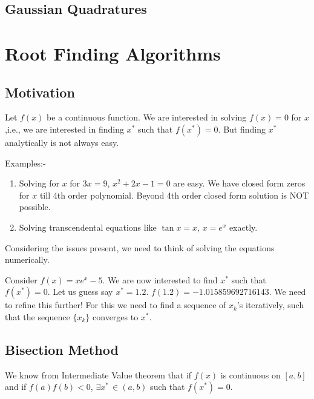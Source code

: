 \documentclass[
]{book}
\begin{document}
\hypertarget{gaussian-quadratures}{%
\section{Gaussian Quadratures}\label{gaussian-quadratures}}

\hypertarget{root-finding-algorithms}{%
\chapter{Root Finding Algorithms}\label{root-finding-algorithms}}

\hypertarget{motivation-2}{%
\section{Motivation}\label{motivation-2}}

Let \(f(x)\) be a continuous function. We are interested in solving \(f(x)=0\) for \(x\),i.e., we are interested in finding \(x^*\) such that \(f(x^*)=0\). But finding \(x^*\) analytically is not always easy.

Examples:-

\begin{enumerate}
\def\labelenumi{\arabic{enumi}.}
\item
  Solving for \(x\) for \(3x=9\), \(x^2+2x-1=0\) are easy. We have closed form zeros for \(x\) till 4th order polynomial. Beyond 4th order closed form solution is NOT possible.
\item
  Solving transcendental equations like \(\tan x = x\), \(x=e^x\) exactly.
\end{enumerate}

Considering the issues present, we need to think of solving the equations numerically.

Consider \(f(x) = xe^x-5\). We are now interested to find \(x^*\) such that \(f(x^*)=0\). Let us guess say \(x^*=1.2\). \(f(1.2) = -1.015859692716143\). We need to refine this further! For this we need to find a sequence of \(x_k\)'s iteratively, such that the sequence \(\{x_k\}\) converges to \(x^*\).

\hypertarget{bisection-method}{%
\section{Bisection Method}\label{bisection-method}}

We know from Intermediate Value theorem that if \(f(x)\) is continuous on \([a,b]\) and if \(f(a) f(b)<0\), \(\exists x^* \, \in(a,b)\) such that \(f(x^*)=0\).
\end{document}
